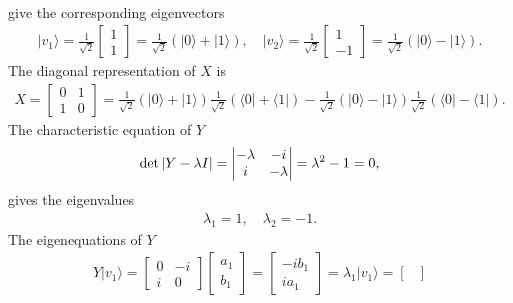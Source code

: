 \documentclass[en]{sol-man}
\begin{document}
\begin{sol}
\begin{align}
    \end{align}
    give the corresponding eigenvectors
    \begin{align}
        \lvert v_1\rangle=\frac{1}{\sqrt{2}}\begin{bmatrix}
            1\\
            1
        \end{bmatrix}=\frac{1}{\sqrt{2}}(\lvert 0\rangle+\lvert 1\rangle),\quad\lvert v_2\rangle=\frac{1}{\sqrt{2}}\begin{bmatrix}
            1\\
            -1
        \end{bmatrix}=\frac{1}{\sqrt{2}}(\lvert 0\rangle-\lvert 1\rangle).
    \end{align}
    The diagonal representation of $X$ is
    \begin{align}
        X=\begin{bmatrix}
            0&1\\
            1&0
        \end{bmatrix}=\frac{1}{\sqrt{2}}(\lvert 0\rangle+\lvert 1\rangle)\frac{1}{\sqrt{2}}(\langle 0\rvert+\langle 1\rvert)-\frac{1}{\sqrt{2}}(\lvert 0\rangle-\lvert 1\rangle)\frac{1}{\sqrt{2}}(\langle 0\rvert-\langle 1\rvert).
    \end{align}
    The characteristic equation of $Y$
    \begin{align}
        \det\left\lvert Y-\lambda I\right\rvert=\left\lvert\begin{matrix}
            -\lambda&-i\\
            i&-\lambda
        \end{matrix}\right\rvert=\lambda^2-1=0,
    \end{align}
    gives the eigenvalues
    \begin{align}
        \lambda_1=1,\quad\lambda_2=-1.
    \end{align}
    The eigenequations of $Y$
    \begin{align}
        Y\lvert v_1\rangle=\begin{bmatrix}
            0&-i\\
            i&0
        \end{bmatrix}\begin{bmatrix}
            a_1\\
            b_1
        \end{bmatrix}=\begin{bmatrix}
            -ib_1\\
            ia_1
        \end{bmatrix}=\lambda_1\lvert v_1\rangle=\begin{bmatrix}

\end{bmatrix}
\end{align}
\end{sol}
\end{document}
